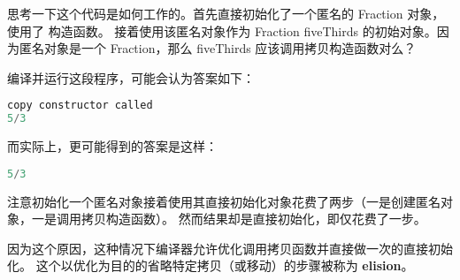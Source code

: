 \documentclass[../../LearnCpp.tex]{subfiles}
\begin{document}
思考一下这个代码是如何工作的。首先直接初始化了一个匿名的 Fraction 对象，使用了  构造函数。
接着使用该匿名对象作为 Fraction fiveThirds 的初始对象。因为匿名对象是一个 Fraction，那么 fiveThirds 应该调用拷贝构造函数对么？

编译并运行这段程序，可能会认为答案如下：

\begin{lstlisting}[language=C++]
copy constructor called
5/3
\end{lstlisting}

而实际上，更可能得到的答案是这样：

\begin{lstlisting}[language=C++]
5/3
\end{lstlisting}

注意初始化一个匿名对象接着使用其直接初始化对象花费了两步（一是创建匿名对象，一是调用拷贝构造函数）。
然而结果却是直接初始化，即仅花费了一步。

因为这个原因，这种情况下编译器允许优化调用拷贝函数并直接做一次的直接初始化。
这个以优化为目的的省略特定拷贝（或移动）的步骤被称为 \textbf{elision}。
\end{document}
